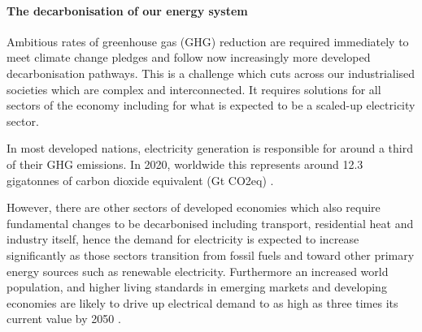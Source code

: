 \documentclass[preprint,12pt]{elsarticle}
\begin{document}



\paragraph{The decarbonisation of our energy system}
Ambitious rates of greenhouse gas (GHG) reduction are required immediately to meet climate change pledges and follow now increasingly more developed decarbonisation pathways. This is a challenge which cuts across our industrialised societies which are complex and interconnected. It requires solutions for all sectors of the economy including for what is expected to be a scaled-up  electricity sector.

In most developed nations, electricity generation is responsible for around a third of their GHG emissions. In 2020, worldwide this represents around 12.3 gigatonnes of carbon dioxide equivalent (Gt CO2eq) \cite{R4}.

However, there are other sectors of developed economies which also require fundamental changes to be decarbonised including transport, residential heat and industry itself, hence the demand for electricity is expected to increase significantly as those sectors transition from fossil fuels and toward other primary energy sources such as renewable electricity. Furthermore an increased world population, and higher living standards in emerging markets and developing economies are likely to drive up electrical demand to as high as three times its current value by 2050 \cite{R4}.
\end{document}
